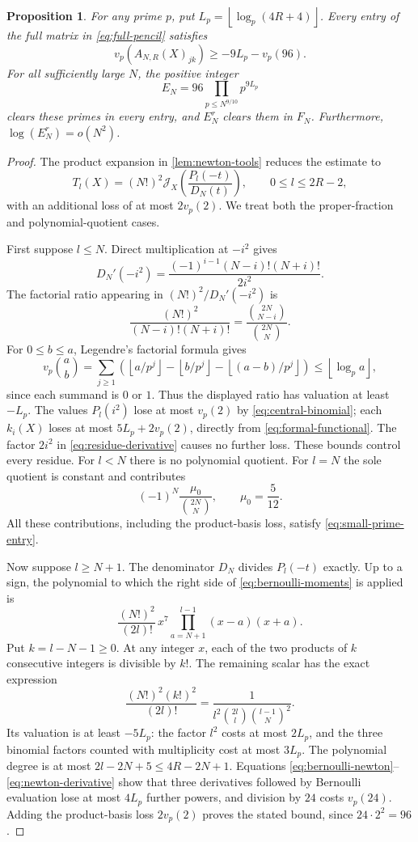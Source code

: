 \documentclass[11pt,letterpaper]{article}
\newtheorem{proposition}[proposition]{Proposition}
\theoremstyle{definition}
\newcommand{\J}{\mathcal J}
\newcommand{\floor}[1]{\left\lfloor #1\right\rfloor}
\begin{document}
\begin{proposition}\label{prop:small-primes}
For any prime $p$, put $L_p=\floor{\log_p(4R+4)}$. Every entry of the
full matrix in \eqref{eq:full-pencil} satisfies
\begin{equation}\label{eq:small-prime-entry}
 v_p(A_{N,R}(X)_{jk})\ge-9L_p-v_p(96).
\end{equation}
For all sufficiently large $N$, the positive integer
\begin{equation}\label{eq:small-prime-factor}
 E_N=96\prod_{p\le N^{9/10}}p^{9L_p}
\end{equation}
clears these primes in every entry, and $E_N^r$ clears them in $F_N$.
Furthermore, $\log(E_N^r)=o(N^2)$.
\end{proposition}
\begin{proof}
The product expansion in \cref{lem:newton-tools} reduces the estimate to
\[
 T_l(X)=(N!)^2\J_X\left(\frac{P_l(-t)}{D_N(t)}\right),
 \qquad 0\le l\le2R-2,
\]
with an additional loss of at most $2v_p(2)$.
We treat both the proper-fraction and polynomial-quotient cases.

First suppose $l\le N$. Direct multiplication at $-i^2$ gives
\begin{equation}\label{eq:residue-derivative}
 D_N'(-i^2)=\frac{(-1)^{i-1}(N-i)!(N+i)!}{2i^2}.
\end{equation}
The factorial ratio appearing in $(N!)^2/D_N'(-i^2)$ is
\[
 \frac{(N!)^2}{(N-i)!(N+i)!}
 =\frac{\binom{2N}{N-i}}{\binom{2N}{N}}.
\]
For $0\le b\le a$, Legendre's factorial formula gives
\[
 v_p\binom ab
 =\sum_{j\ge1}\left(
 \floor{a/p^j}-\floor{b/p^j}-\floor{(a-b)/p^j}\right)
 \le\floor{\log_p a},
\]
since each summand is $0$ or $1$. Thus the displayed ratio has valuation
at least $-L_p$. The values $P_l(i^2)$ lose at most $v_p(2)$ by
\eqref{eq:central-binomial}; each $k_i(X)$ loses at most
$5L_p+2v_p(2)$, directly from \eqref{eq:formal-functional}.
The factor $2i^2$ in \eqref{eq:residue-derivative} causes no further
loss. These bounds control every residue. For $l<N$ there is no
polynomial quotient. For $l=N$ the sole quotient is constant and
contributes
\[
 (-1)^N\frac{\mu_0}{\binom{2N}{N}},\qquad \mu_0=\frac5{12}.
\]
All these contributions, including the product-basis loss, satisfy
\eqref{eq:small-prime-entry}.

Now suppose $l\ge N+1$. The denominator $D_N$ divides $P_l(-t)$
exactly. Up to a sign, the polynomial to which the right side of
\eqref{eq:bernoulli-moments} is applied is
\[
 \frac{(N!)^2}{(2l)!}\,x^7
 \prod_{a=N+1}^{l-1}(x-a)(x+a).
\]
Put $k=l-N-1\ge0$. At any integer $x$, each of the two products of
$k$ consecutive integers is divisible by $k!$. The remaining scalar
has the exact expression
\[
 \frac{(N!)^2(k!)^2}{(2l)!}
 =\frac1{l^2\binom{2l}{l}\binom{l-1}{N}^2}.
\]
Its valuation is at least $-5L_p$: the factor $l^2$ costs at most
$2L_p$, and the three binomial factors counted with multiplicity cost
at most $3L_p$. The polynomial degree is at most
$2l-2N+5\le4R-2N+1$. Equations
\eqref{eq:bernoulli-newton}--\eqref{eq:newton-derivative} show that
three derivatives followed by Bernoulli evaluation lose at most
$4L_p$ further powers, and division by $24$ costs $v_p(24)$.
Adding the product-basis loss $2v_p(2)$ proves the stated bound, since
$24\cdot2^2=96$.


\end{proof}
\end{document}
